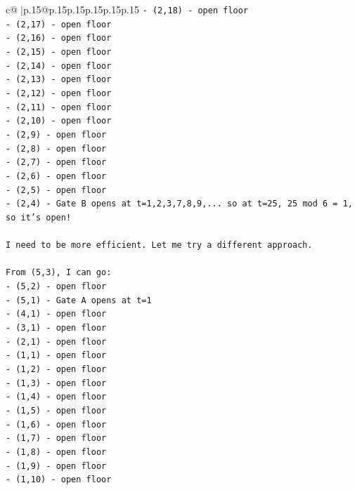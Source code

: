 \documentclass{article}
\begin{document}
{\begin{supertabular}{c@{$\;$}|p{.15\linewidth}@{}p{.15\linewidth}p{.15\linewidth}p{.15\linewidth}p{.15\linewidth}p{.15\linewidth}}
{{{\texttt{{-} (2,18) {-} open floor} \\
\texttt{{-} (2,17) {-} open floor} \\
\texttt{{-} (2,16) {-} open floor} \\
\texttt{{-} (2,15) {-} open floor} \\
\texttt{{-} (2,14) {-} open floor} \\
\texttt{{-} (2,13) {-} open floor} \\
\texttt{{-} (2,12) {-} open floor} \\
\texttt{{-} (2,11) {-} open floor} \\
\texttt{{-} (2,10) {-} open floor} \\
\texttt{{-} (2,9) {-} open floor} \\
\texttt{{-} (2,8) {-} open floor} \\
\texttt{{-} (2,7) {-} open floor} \\
\texttt{{-} (2,6) {-} open floor} \\
\texttt{{-} (2,5) {-} open floor} \\
\texttt{{-} (2,4) {-} Gate B opens at t=1,2,3,7,8,9,... so at t=25, 25 mod 6 = 1, so it's open!} \\
\\ 
\texttt{I need to be more efficient. Let me try a different approach.} \\
\\ 
\texttt{From (5,3), I can go:} \\
\texttt{{-} (5,2) {-} open floor} \\
\texttt{{-} (5,1) {-} Gate A opens at t=1} \\
\texttt{{-} (4,1) {-} open floor} \\
\texttt{{-} (3,1) {-} open floor} \\
\texttt{{-} (2,1) {-} open floor} \\
\texttt{{-} (1,1) {-} open floor} \\
\texttt{{-} (1,2) {-} open floor} \\
\texttt{{-} (1,3) {-} open floor} \\
\texttt{{-} (1,4) {-} open floor} \\
\texttt{{-} (1,5) {-} open floor} \\
\texttt{{-} (1,6) {-} open floor} \\
\texttt{{-} (1,7) {-} open floor} \\
\texttt{{-} (1,8) {-} open floor} \\
\texttt{{-} (1,9) {-} open floor} \\
\texttt{{-} (1,10) {-} open floor} \\
}}}
\end{supertabular}}
\end{document}
